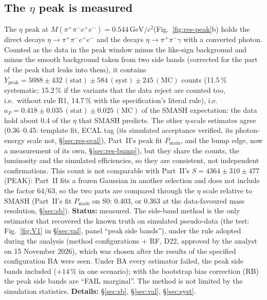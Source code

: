\documentclass[11pt,a4paper]{article}
\newcommand{\pipi}{\ensuremath{\pi^{+}\pi^{-}}\xspace}
\newcommand{\ppee}{\ensuremath{\pi^{+}\pi^{-}e^{+}e^{-}}\xspace}
\newcommand{\Mfour}{\ensuremath{M(\pi^{+}\pi^{-}e^{+}e^{-})}\xspace}
\newcommand{\GeVcc}{\ensuremath{\mathrm{GeV}/c^{2}}\xspace}
\newcommand{\Pmain}{\ensuremath{P_{\mathrm{main}}}\xspace}
\newcommand{\aP}{\ensuremath{a_P}\xspace}
\newcommand{\Ypeak}{\ensuremath{Y_{\mathrm{peak}}}\xspace}
\begin{document}
\subsection{The \texorpdfstring{$\eta$}{eta} peak is measured}
\label{sec:res-peak}
The $\eta$ peak at \Mfour$=0.544$\,\GeVcc (Fig.~\ref{fig:res-peak}b) holds the direct decays $\eta\to\ppee$ and the decays $\eta\to\pipi\gamma$
with a converted photon. Counted as the data in the peak window minus the like-sign background and minus the smooth background taken from two side
bands (corrected for the part of the peak that leaks into them), it contains
$\Ypeak=5088\pm432\,(\mathrm{stat})\pm584\,(\mathrm{syst})\pm245\,(\mathrm{MC})$ counts (11.5\,\% systematic; 15.2\,\% if the variants that the
data reject are counted too, i.e.\ without rule R1, 14.7\,\% with the specification's literal rule), i.e.\
$\aP=0.418\pm0.035\,(\mathrm{stat})\pm0.025\,(\mathrm{MC})$ of the SMASH expectation:
the data hold about 0.4 of the $\eta$ that SMASH predicts. The other $\eta$-scale estimates agree (0.36--0.45: template fit,
ECAL tag (its simulated acceptance verified, its photon-energy scale not, \S\ref{sec:res-ecal}), Part~II's peak fit \Pmain, and the bump edge, now a measurement of its own, \S\ref{sec:res-bump}), but
they share the counts, the luminosity and the simulated efficiencies, so they are consistent, not independent confirmations.
This count is not comparable with Part~II's $S=4364\pm310\pm477$ (PEAK): Part~II fits a frozen Gaussian in another selection
and does not include the factor 64/63, so the two parts are compared through the $\eta$ scale relative to SMASH (Part~II's fit
\Pmain on S0: 0.403, or 0.363 at the data-favoured mass resolution, \S\ref{sec:sb}).
\textbf{Status:} measured. The side-band method is the only estimator that recovered the known truth on simulated pseudo-data (the test:
Fig.~\ref{fig:V1} in \S\ref{sec:val}, panel ``peak side bands''), under the rule adopted during the analysis (method configurations + RF, D22, approved by the analyst on 15 November 2026), which was chosen after the results of the specified
configuration BA were seen. Under BA every estimator failed, the peak side bands included ($+14$\,\% in one scenario); with the bootstrap bias
correction (RB) the peak side bands are ``FAIL marginal''. The method is not limited by the simulation statistics. \textbf{Details:} \S\ref{sec:sb}, \S\ref{sec:val}, \S\ref{sec:syst}.
\end{document}
